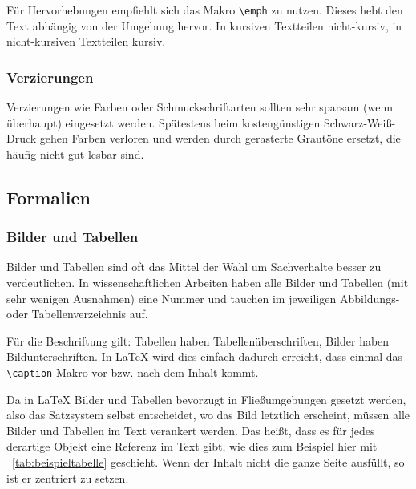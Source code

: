 \documentclass[a4paper, 11pt]{article}
\begin{document}
Für Hervorhebungen empfiehlt sich das Makro \texttt{\textbackslash emph} zu nutzen. Dieses hebt den Text abhängig von der Umgebung hervor. In kursiven Textteilen nicht-kursiv, in nicht-kursiven Textteilen kursiv.

\subsubsection{Verzierungen}

Verzierungen wie Farben oder Schmuckschriftarten sollten sehr sparsam (wenn überhaupt) eingesetzt werden. Spätestens beim kostengünstigen Schwarz-Weiß-Druck gehen Farben verloren und werden durch gerasterte Grautöne ersetzt, die häufig nicht gut lesbar sind.

\subsection{Formalien}
\subsubsection{Bilder und Tabellen}

Bilder und Tabellen sind oft das Mittel der Wahl um Sachverhalte besser zu verdeutlichen. In wissenschaftlichen Arbeiten haben alle Bilder und Tabellen (mit sehr wenigen Ausnahmen) eine Nummer und tauchen im jeweiligen Abbildungs- oder Tabellenverzeichnis auf.

Für die Beschriftung gilt: Tabellen haben Tabellenüberschriften, Bilder haben Bildunterschriften. In \LaTeX{} wird dies einfach dadurch erreicht, dass einmal das \texttt{\textbackslash caption}-Makro vor bzw. nach dem Inhalt kommt.

Da in \LaTeX{} Bilder und Tabellen bevorzugt in Fließumgebungen gesetzt werden, also das Satzsystem selbst entscheidet, wo das Bild letztlich erscheint, müssen alle Bilder und Tabellen im Text verankert werden. Das heißt, dass es für jedes derartige Objekt eine Referenz im Text gibt, wie dies zum Beispiel hier mit \tablename~\ref{tab:beispieltabelle} geschieht. Wenn der Inhalt nicht die ganze Seite ausfüllt, so ist er zentriert zu setzen.

\begin{table}[tbhp]
    \caption{Beispieltabelle}
    \label{tab:beispieltabelle}
\end{table}
\end{document}
